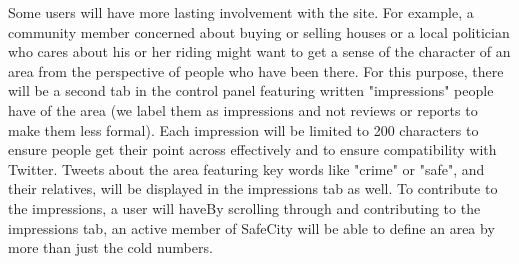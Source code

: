 \documentclass[paper=a4, fontsize=11pt]{scrartcl} %
\numberwithin{equation}{section} %
\numberwithin{figure}{section} %
\numberwithin{table}{section} %
\begin{document}
Some users will have more lasting involvement with the site. For example, a community member concerned about buying or selling houses or a local politician who cares about his or her riding might want to get a sense of the character of an area from the perspective of people who have been there. For this purpose, there will be a second tab in the control panel featuring written "impressions" people have of the area (we label them as impressions and not reviews or reports to make them less formal). Each impression will be limited to 200 characters to ensure people get their point across effectively and to ensure compatibility with Twitter. Tweets about the area featuring key words like "crime" or "safe", and their relatives, will be displayed in the impressions tab as well. To contribute to the impressions, a user will haveBy scrolling through and contributing to the impressions tab, an active member of SafeCity will be able to define an area by more than just the cold numbers. 
\end{document}
